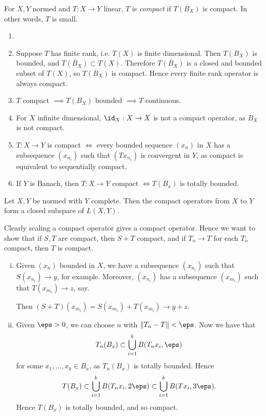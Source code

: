 \documentclass[12pt]{article}
\begin{document}
For $X, Y$ normed and $T : X \to Y$ linear, $T$ is \emph{compact} if $\overline{T(B_X)}$ is compact. In other words, $T$ is small.

\begin{remark}
	\begin{enumerate}
		\item[]
		\item Suppose $T$ has finite rank, i.e. $T(X)$ is finite dimensional. Then $T(B_X)$ is bounded, and $\overline{T(B_X)} \subset T(X)$. Therefore $\overline{T(B_X)}$ is a closed and bounded subset of $T(X)$, so $\overline{T(B_X)}$ is compact. Hence every finite rank operator is always compact.
		\item $T$ compact $\implies T(B_X)$ bounded $\implies T$ continuous.
		\item For $X$ infinite dimensional, $\id_X : X \to X$ is not a compact operator, as $B_X$ is not compact.
		\item $T : X \to Y$ is compact $\iff$ every bounded sequence $(x_n)$ in $X$ has a subsequence $(x_{n_i})$ such that $(Tx_{n_i})$ is convergent in $Y$, as compact is equivalent to sequentially compact.
		\item If $Y$ is Banach, then $T : X \to Y$ compact $\iff T(B_x)$ is totally bounded.
	\end{enumerate}
\end{remark}

\begin{proposition}
	Let $X, Y$ be normed with $Y$ complete. Then the compact operators from $X$ to $Y$ form a closed subspace of $L(X,Y)$.
\end{proposition}

\begin{proofbox}
	Clearly scaling a compact operator gives a compact operator. Hence we want to show that if $S, T$ are compact, then $S + T$ compact, and if $T_n \to T$ for each $T_n$ compact, then $T$ is compact.
	\begin{enumerate}[(i)]
		\item Given $(x_n)$ bounded in $X$, we have a subsequence $(x_{n_i})$ such that $S(x_{n_i}) \to y$, for example. Moreover, $(x_{n_i})$ has a subsequence $(x_{m_i})$ such that $T(x_{m_i}) \to z$, say.

			Then $(S+T)(x_{m_i}) = S(x_{m_i}) + T(x_{m_i}) \to y + z$.
		\item Given $\eps > 0$, we can choose $n$ with $\|T_n - T\| < \eps$. Now we have that
			\[
			T_n(B_x) \subset \bigcup_{i = 1}^{k} B(T_nx_i, \eps)
			\]
			for some $x_1, \ldots, x_k \in B_x$, as $T_n(B_x)$ is totally bounded. Hence
			\[
			T(B_x) \subset \bigcup_{i = 1}^{k} B(T_n x_i, 2\eps) \subset \bigcup_{i = 1}^{k} B(T x_i, 3\eps).
			\]
			Hence $T(B_x)$ is totally bounded, and so compact.
	\end{enumerate}
\end{proofbox}
\end{document}
